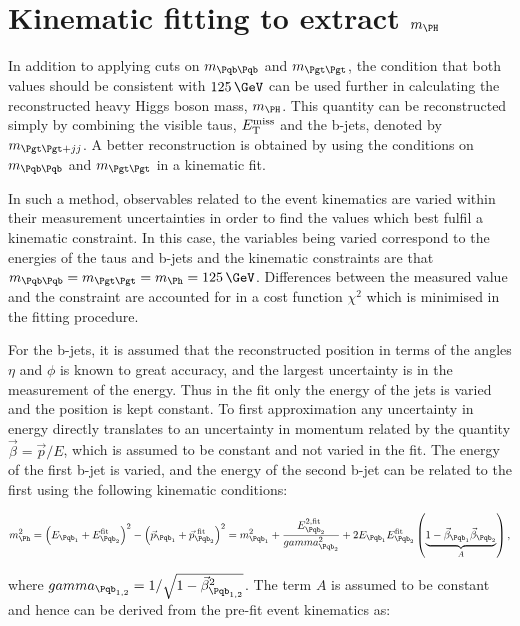 \section{Kinematic fitting to extract $m_{\PH}$}
\label{sec:kinematicfit}

In addition to applying cuts on $m_{\Pqb\Pqb}$ and $m_{\Pgt\Pgt}$, the condition that
both values should be consistent with $125\,\GeV$ can be used further in
calculating the reconstructed heavy Higgs boson mass, $m_{\PH}$. This quantity can be reconstructed simply
by combining the visible taus, $E_{\mathrm{T}}^{\text{miss}}$ and the b-jets, denoted by $m_{\Pgt\Pgt+jj}$.
A better reconstruction is obtained by using the conditions on $m_{\Pqb\Pqb}$ and
$m_{\Pgt\Pgt}$ in a kinematic fit. 

In such a method, observables related to the
event kinematics are varied within their measurement uncertainties in order to
find the values which best fulfil a kinematic constraint. In this case, the
variables being varied correspond to the energies of the taus and b-jets and the
kinematic constraints are that $m_{\Pqb\Pqb} = m_{\Pgt\Pgt} = m_{\Ph} = 125\,\GeV$. 
Differences between the measured value and the constraint are accounted for in a cost
function $\chi^{2}$ which is minimised in the fitting procedure.  

For the b-jets, it is assumed that the reconstructed position in terms of the
angles $\eta$ and $\phi$ is known to great accuracy, and the largest
uncertainty is in the measurement of the energy. Thus in the fit only the
energy of the jets is varied and the position is kept constant. To first
approximation any uncertainty in energy directly translates to an uncertainty in
momentum related by the quantity $\vec{\beta} = \vec{p}/E$, which is assumed to be constant and 
not varied in the fit. The energy of the first b-jet is varied, and the
energy of the second b-jet can be related to the first using the following
kinematic conditions:

\begin{equation}
m_{\Ph}^{2} = \left( E_{\Pqb_{1}} + E_{\Pqb_{2}}^{\text{fit}} \right)^{2} -
\left(\vec{p}_{\Pqb_{1}} + \vec{p}_{\Pqb_{2}}^{\text{~fit}}\right)^{2} 
= m_{\Pqb_{1}}^{2} + \frac{E_{\Pqb_{2}}^{2,\text{fit}}}{\gamma_{\Pqb_{2}}^{2}} +
2E_{\Pqb_{1}}E_{\Pqb_{2}}^{\text{fit}}\left(\underbrace{1-\vec{\beta}_{\Pqb_{1}}\vec{\beta}_{\Pqb_{2}}}_{A}\right),   
\label{eq:bjetkinfit}         
\end{equation}

where $\gamma_{\Pqb_{1,2}} = 1/\sqrt{1-\vec{\beta}_{\Pqb_{1,2}}^{2}}$. The term $A$ is
assumed to be constant and hence can be derived from the pre-fit event
kinematics as:

